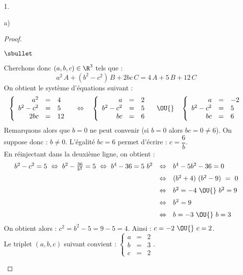 \documentclass[11pt]{article}%
\begin{document}
\begin{noliste}{1.}
\begin{noliste}{a)}
\begin{proof}
\begin{noliste}{$\sbullet$}
    \item Cherchons donc $(a,b,c)\in\R^3$ tels que :
    \[
     a^2 \, A + (b^2-c^2)\, B + 2bc \, C = 4 \, A + 5 \, B + 12\, C
    \]
    On obtient le système d'équations suivant :
    \[
     \left\{
     \begin{array}{rcl}
      a^2 & = & 4\\
      b^2-c^2 & = & 5\\
      2bc & = & 12
     \end{array}
     \right. 
     \quad \Leftrightarrow \quad
     \left\{
     \begin{array}{rcl}
      a & = & 2\\
      b^2-c^2 & = & 5\\
      bc & = & 6
     \end{array}
     \right. 
     \quad \OU{} \quad
     \left\{
     \begin{array}{rcl}
      a & = & -2\\
      b^2 - c^2 & = & 5\\
      bc & = & 6
     \end{array}
     \right.
    \]
    Remarquons alors que $b = 0$ ne peut convenir (si $b = 0$ alors
    $bc = 0 \neq 6$). On suppose donc : $b \neq 0$. L'égalité $bc = 6$
    permet d'écrire : $c = \dfrac{6}{b}$.\\
    En réinjectant dans la deuxième ligne, on obtient :
    \[
    \begin{array}{rcl}
      b^2 - c^2 = 5 \ \Leftrightarrow \ b^2 - \frac{36}{b^2} = 5 \
      \Leftrightarrow \ b^4 - 36 = 5 \ b^2 & \Leftrightarrow & b^4 - 5
      b^2 - 36 = 0
      \\[.2cm]
      & \Leftrightarrow & (b^2 + 4) \ (b^2 - 9) \ = \ 0
      \\[.2cm]
      & \Leftrightarrow & b^2 = -4 \ \OU{} \ b^2 = 9
      \\[.2cm]
      & \Leftrightarrow & b^2 = 9
      \\[.2cm]
      & \Leftrightarrow & b = -3 \ \OU{} \ b = 3
    \end{array}
    \]
    On obtient alors : $c^2 = b^2 - 5 = 9 - 5 = 4$. Ainsi : $c = -2 \
    \OU{} \ c = 2$.\\
    Le triplet $(a,b,c)$ suivant convient : $\left\{
     \begin{array}{rcl}
      a & = & 2\\
      b & = & 3\\
      c & = & 2
     \end{array}
     \right.$.
     


\end{noliste}
\end{proof}
\end{noliste}
\end{noliste}
\end{document}
